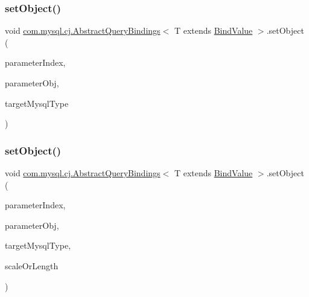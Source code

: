\mbox{\label{classcom_1_1mysql_1_1cj_1_1_abstract_query_bindings_a761eb9a0e429674a6fe9a4a29db29f8b}} 
\subsubsection{\texorpdfstring{set\+Object()}{setObject()}\hspace{0.1cm}{\footnotesize\ttfamily [2/3]}}
{\footnotesize\ttfamily void \mbox{\hyperlink{classcom_1_1mysql_1_1cj_1_1_abstract_query_bindings}{com.\+mysql.\+cj.\+Abstract\+Query\+Bindings}}$<$ T extends \mbox{\hyperlink{interfacecom_1_1mysql_1_1cj_1_1_bind_value}{Bind\+Value}} $>$.set\+Object (\begin{DoxyParamCaption}\item[{int}]{parameter\+Index,  }\item[{Object}]{parameter\+Obj,  }\item[{\mbox{\hyperlink{enumcom_1_1mysql_1_1cj_1_1_mysql_type}{Mysql\+Type}}}]{target\+Mysql\+Type }\end{DoxyParamCaption})}

\mbox{\label{classcom_1_1mysql_1_1cj_1_1_abstract_query_bindings_a3a10937bc972e71cbf2b2ffde0578898}} 
\subsubsection{\texorpdfstring{set\+Object()}{setObject()}\hspace{0.1cm}{\footnotesize\ttfamily [3/3]}}
{\footnotesize\ttfamily void \mbox{\hyperlink{classcom_1_1mysql_1_1cj_1_1_abstract_query_bindings}{com.\+mysql.\+cj.\+Abstract\+Query\+Bindings}}$<$ T extends \mbox{\hyperlink{interfacecom_1_1mysql_1_1cj_1_1_bind_value}{Bind\+Value}} $>$.set\+Object (\begin{DoxyParamCaption}\item[{int}]{parameter\+Index,  }\item[{Object}]{parameter\+Obj,  }\item[{\mbox{\hyperlink{enumcom_1_1mysql_1_1cj_1_1_mysql_type}{Mysql\+Type}}}]{target\+Mysql\+Type,  }\item[{int}]{scale\+Or\+Length }\end{DoxyParamCaption})}

